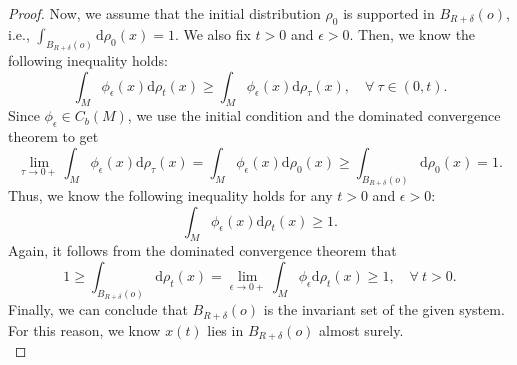\documentclass[11pt]{amsart}
\def\d{\mathrm{d}}
\newcommand{\p}{o}%
\begin{document}
\begin{proof}
Now, we assume that the initial distribution $\rho_0$ is supported in $B_{R+\delta}(\p)$, i.e., $\int_{B_{R+\delta}(\p)}\d\rho_0(x)=1$. We also fix $t>0$ and $\epsilon>0$. Then, we know the following inequality holds:
\[
\int_{M}\phi_\epsilon(x)\d\rho_t(x)\geq\int_{M}\phi_\epsilon(x)\d\rho_\tau(x),\quad\forall~\tau\in(0, t).
\]
Since $\phi_\epsilon\in C_b(M)$, we use the initial condition and the dominated convergence theorem to get
\[
\lim_{\tau\to0+}\int_M \phi_\epsilon(x) \d\rho_\tau(x)=\int_M\phi_\epsilon(x) \d\rho_0(x)\geq\int_{B_{R+\delta}(\p)}\d\rho_0(x)=1.
\]
Thus, we know the following inequality holds for any $t>0$ and $\epsilon>0$:
\[
\int_{M}\phi_\epsilon(x)\d\rho_t(x)\geq1.
\]
Again, it follows from  the dominated convergence theorem that 
\[
1\geq \int_{B_{R+\delta}(\p)}\d\rho_t(x)=\lim_{\epsilon\to0+}\int_M\phi_\epsilon \d\rho_t(x)\geq1,\quad\forall~t>0.
\]
Finally, we can conclude that $B_{R+\delta}(\p)$ is the invariant set of the given system. For this reason, we know $x(t)$ lies in $B_{R+\delta}(o)$ almost surely. \\


\end{proof}
\end{document}
